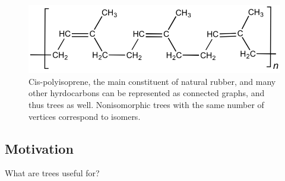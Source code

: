 \documentclass[a4paper,10pt]{report}
\begin{document}
\begin{figure}[h!]
	\begin{centering}
	\begin{center}
	\includegraphics[width=\linewidth]{./chemistry.png}
	\caption{Cis-polyisoprene, the main constituent of natural rubber, and many other hyrdocarbons can be represented as connected graphs, and thus trees as well. Nonisomorphic trees with the same number of vertices correspond to isomers.}
	\label{fig:??????}
	\end{center}
	\par\end{centering}
\end{figure}

\subsection{Motivation}
What are trees useful for?
\end{document}

